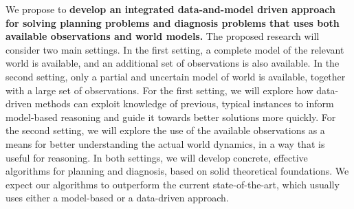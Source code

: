 \documentclass[12pt]{article}
\newcommand{\note}[1]{\textbf{\textit{#1}}}
\begin{document}



We propose to {\bf develop an integrated data-and-model driven approach for solving planning problems and diagnosis problems that uses both available observations and world models.} 
The proposed research will consider two main settings. In the first setting, a complete model of the relevant world is available, and an additional set of observations is also available. In the second setting, only a partial and uncertain model of world is available, together with a large set of observations. For the first setting, we will explore how data-driven methods can exploit knowledge of previous, typical instances to inform model-based reasoning and guide it towards better solutions more quickly. For the second setting, we will explore the use of the available observations as a means for better understanding the actual world dynamics, 
in a way that is useful for reasoning. In both settings, we will develop concrete, effective algorithms for planning and diagnosis, based on solid theoretical foundations. We expect our algorithms to outperform the current state-of-the-art, which usually uses either a model-based or a data-driven approach. 
\end{document}

